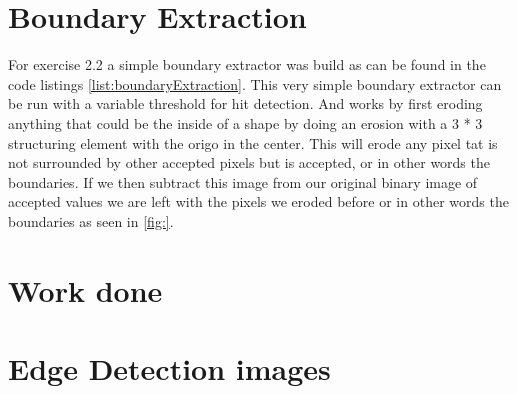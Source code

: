 \documentclass[10pt,a4paper]{article}
\begin{document}
\section{Boundary Extraction}
For exercise 2.2 a simple boundary extractor was build as can be found in the code listings \ref{list:boundaryExtraction}. This very simple boundary extractor can be run with a variable threshold for hit detection. And works by first eroding anything that could be the inside of a shape by doing an erosion with a 3 * 3 structuring element with the origo in the center. This will erode any pixel tat is not surrounded by other accepted pixels but is accepted, or in other words the boundaries. If we then subtract this image from our original binary image of accepted values we are left with the pixels we eroded before or in other words the boundaries as seen in \ref{fig:}.


\section{Work done}

\section{Edge Detection images}
\end{document}

